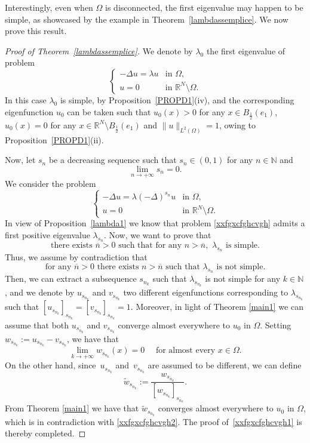 \documentclass[12pt,a4paper,intlimits,sumlimits]{amsart}
\def \N {\mathbb{N}}
\def \R {\mathbb{R}}
\theoremstyle{definition}
\theoremstyle{plain}
\numberwithin{equation}{section}
\begin{document}
Interestingly, even when $\Omega$ is disconnected,
the first eigenvalue may happen to be simple, as showcased by the example
in Theorem~\ref{lambdassemplice}. We now prove this result.

\begin{proof}[Proof of Theorem~\ref{lambdassemplice}]
We denote by $\lambda_0$ the first eigenvalue of problem
\[
\begin{cases}
-\Delta u=\lambda u &\mbox{in }\Omega,
\\
u=0  &\mbox{in }\R^N\setminus \Omega.
\end{cases}
\]
In this case $\lambda_0$ is simple, by Proposition~\ref{PROPD1}(iv), and the corresponding  eigenfunction $u_0$ can be taken such that $u_0(x)>0$ for any $x\in B_\frac{1}{2}(e_1)$, $u_0(x)=0$ for any $x\in \R^N\setminus B_\frac{1}{2}(e_1)$ and $\|u\|_{L^2(\Omega)}=1$, owing to Proposition~\ref{PROPD1}(ii).

Now, let $s_n$ be a decreasing sequence such that $s_n\in (0,1)$ for any $n\in \N$ and
\[
\lim_{n\to +\infty}s_n=0.
\]
We consider the problem 
\begin{equation}\label{xxfgxcfghcvgh}
\begin{cases}
-\Delta u=\lambda (-\Delta)^{s_n} u &\mbox{in }\Omega,
\\
u=0  &\mbox{in }\R^N\setminus \Omega.
\end{cases}
\end{equation}
In view of Proposition~\ref{lambda1} we know that problem \eqref{xxfgxcfghcvgh} admits a first positive eigenvalue $\lambda_{s_n}$.
Now, we want to prove that
\begin{equation}\label{xxfgxcfghcvgh1}
\mbox{there exists }\overline n>0 \mbox{ such that for any } n>\overline n,\,\, \lambda_{s_n} \mbox{ is simple}.
\end{equation}
Thus, we assume by contradiction that
\[
\mbox{for any }\overline n>0 \mbox{ there exists } n>\overline n \mbox{ such that } \lambda_{s_n} \mbox{ is not simple}.
\]
Then, we can extract a subsequence $s_{n_k}$ such that $\lambda_{s_{n_k}}$ is not simple for any $k\in \N$, and we denote by $u_{s_{n_k}}$ and $v_{s_{n_k}}$ two different eigenfunctions corresponding to $\lambda_{s_{n_k}}$ such that $[u_{s_{n_k}}]_{s_{n_k}}=[v_{s_{n_k}}]_{s_{n_k}}=1$.
Moreover, in light of Theorem \ref{main1} we can assume that both
$u_{s_{n_k}}$ and $v_{s_{n_k}}$ converge almost everywhere to $u_0$ in $\Omega$. Setting $w_{s_{n_k}}:=u_{s_{n_k}}-v_{s_{n_k}}$, we have that
\begin{equation}\label{xxfgxcfghcvgh2}
\lim_{k\to +\infty}w_{s_{n_k}}(x)=0 \quad \mbox{ for almost every }x\in \Omega.
\end{equation}
On the other hand, since~$u_{s_{n_k}}$ and~$v_{s_{n_k}}$ are assumed to be different, we can define
\[
\widetilde w_{s_{n_k}}:=\frac{w_{s_{n_k}}}{[w_{s_{n_k}}]_{s_{n_k}}}.
\]
From Theorem \ref{main1} we have that $\widetilde w_{s_{n_k}}$ converges almost everywhere to $u_0$ in $\Omega$, which is in contradiction with \eqref{xxfgxcfghcvgh2}. The proof of~\eqref{xxfgxcfghcvgh1} is thereby completed.
\end{proof}
\end{document}

